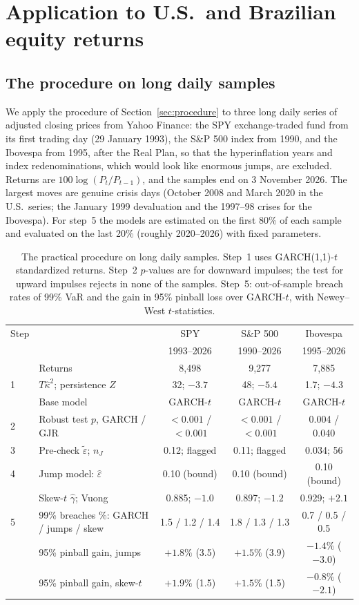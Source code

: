\documentclass[11pt,a4paper]{article}
\theoremstyle{definition}
\theoremstyle{remark}
\begin{document}
\section{Application to U.S.\ and Brazilian equity returns}\label{sec:data}
\subsection{The procedure on long daily samples}\label{sec:daily}
We apply the procedure of Section~\ref{sec:procedure} to three long daily series of adjusted closing prices from Yahoo Finance: the SPY exchange-traded fund from its first trading day (29 January 1993), the S\&P 500 index from 1990, and the Ibovespa from 1995, after the Real Plan, so that the hyperinflation years and index redenominations, which would look like enormous jumps, are excluded. Returns are $100\log(P_t/P_{t-1})$, and the samples end on 3 November 2026. The largest moves are genuine crisis days (October 2008 and March 2020 in the U.S.\ series; the January 1999 devaluation and the 1997--98 crises for the Ibovespa). For step~5 the models are estimated on the first 80\% of each sample and evaluated on the last 20\% (roughly 2020--2026) with fixed parameters.

\begin{table}[ht]\centering\footnotesize\setlength{\tabcolsep}{4pt}
\caption{The practical procedure on long daily samples. Step~1 uses GARCH(1,1)-$t$ standardized returns. Step~2 $p$-values are for downward impulses; the test for upward impulses rejects in none of the samples. Step~5: out-of-sample breach rates of 99\% VaR and the gain in 95\% pinball loss over GARCH-$t$, with Newey--West $t$-statistics.}\label{tab:daily}
\begin{tabular}{llccc}
\toprule
Step & & SPY & S\&P 500 & Ibovespa\\
 & & 1993--2026 & 1990--2026 & 1995--2026\\
\midrule
 & Returns & 8{,}498 & 9{,}277 & 7{,}885\\
1 & $T\hat\kappa^2$; persistence $Z$ & 32; $-3.7$ & 48; $-5.4$ & 1.7; $-4.3$\\
 & Base model & GARCH-$t$ & GARCH-$t$ & GARCH-$t$\\
2 & Robust test $p$, GARCH / GJR & $<0.001$ / $<0.001$ & $<0.001$ / $<0.001$ & 0.004 / 0.040\\
3 & Pre-check $\tilde\varepsilon$; $n_J$ & 0.12; flagged & 0.11; flagged & 0.034; 56\\
4 & Jump model: $\hat\varepsilon$ & 0.10 (bound) & 0.10 (bound) & 0.10 (bound)\\
 & Skew-$t$ $\hat\gamma$; Vuong & 0.885; $-1.0$ & 0.897; $-1.2$ & 0.929; $+2.1$\\
5 & 99\% breaches \%: GARCH / jumps / skew & 1.5 / 1.2 / 1.4 & 1.8 / 1.3 / 1.3 & 0.7 / 0.5 / 0.5\\
 & 95\% pinball gain, jumps & $+1.8\%$ (3.5) & $+1.5\%$ (3.9) & $-1.4\%$ ($-3.0$)\\
 & 95\% pinball gain, skew-$t$ & $+1.9\%$ (1.5) & $+1.5\%$ (1.5) & $-0.8\%$ ($-2.1$)\\
\bottomrule
\end{tabular}
\end{table}
\end{document}
